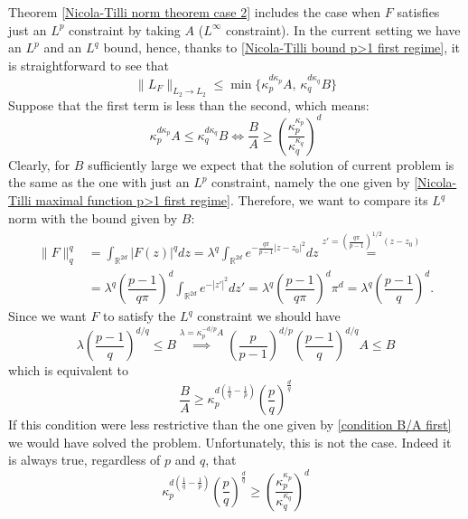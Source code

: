 \documentclass[corpo=11pt, stile=classica, tipotesi=custom,
greek, evenboxes, english]{toptesi}
\numberwithin{equation}{chapter}
\newcommand{\R}{\mathbb{R}} %
\begin{document}
Theorem \ref{Nicola-Tilli norm theorem case 2} includes the case when $F$ satisfies just an $L^p$ constraint by taking $A$ ($L^{\infty}$ constraint). In the current setting we have an $L^p$ and an $L^q$ bound, hence, thanks to \ref{Nicola-Tilli bound p>1 first regime}, it is straightforward to see that
\begin{equation*}
	\| L_F\|_{L_2 \rightarrow L_2} \leq \min\{\kappa_p^{d\kappa_p}A, \, \kappa_q^{d\kappa_q}B\}
\end{equation*}
Suppose that the first term is less than the second, which means:
\begin{equation}\label{condition B/A first}
	\kappa_p^{d\kappa_p}A \leq \kappa_q^{d\kappa_q}B \iff \dfrac{B}{A} \geq \left(\dfrac{\kappa_p^{\kappa_p}}{\kappa_q^{\kappa_q}}\right)^d
\end{equation}
Clearly, for $B$ sufficiently large we expect that the solution of current problem is the same as the one with just an $L^p$ constraint, namely the one given by \eqref{Nicola-Tilli maximal function p>1 first regime}. Therefore, we want to compare its $L^q$ norm with the bound given by $B$:
\begin{align*}
	\| F \|_q^q &= \int_{\R^{2d}} |F(z)|^q dz = \lambda^q \int_{\R^{2d}} e^{-\frac{q\pi}{p-1}|z-z_0|^2} dz \overset{z' = \left(\frac{q\pi}{p-1}\right)^{1/2}(z-z_0)}{=}\\
	&= \lambda^q \left(\dfrac{p-1}{q\pi}\right)^d \int_{\R^{2d}} e^{-|z'|^2}dz' = \lambda^q \left(\dfrac{p-1}{q\pi}\right)^d \pi^d = \lambda^q \left(\dfrac{p-1}{q}\right)^d.
\end{align*}
Since we want $F$ to satisfy the $L^q$ constraint we should have
\begin{equation*}
	\lambda \left(\dfrac{p-1}{q}\right)^{d/q} \leq B \overset{\lambda = \kappa_p^{-d/p}A}{\implies} \left(\dfrac{p}{p-1}\right)^{d/p} \left(\dfrac{p-1}{q}\right)^{d/q}A \leq B
\end{equation*}
which is equivalent to
\begin{equation*}\label{condition B/A second}
	\dfrac{B}{A} \geq \kappa_p^{d\left(\frac1q - \frac1p\right)}\left(\dfrac{p}{q}\right)^{\frac{d}{q}}
\end{equation*}
If this condition were less restrictive than the one given by \eqref{condition B/A first} we would have solved the problem. Unfortunately, this is not the case. Indeed it is always true, regardless of $p$ and $q$, that
\begin{equation*}
	\kappa_p^{d\left(\frac1q - \frac1p\right)}\left(\dfrac{p}{q}\right)^{\frac{d}{q}} \geq \left(\dfrac{\kappa_p^{\kappa_p}}{\kappa_q^{\kappa_q}}\right)^d
\end{equation*}
\end{document}
